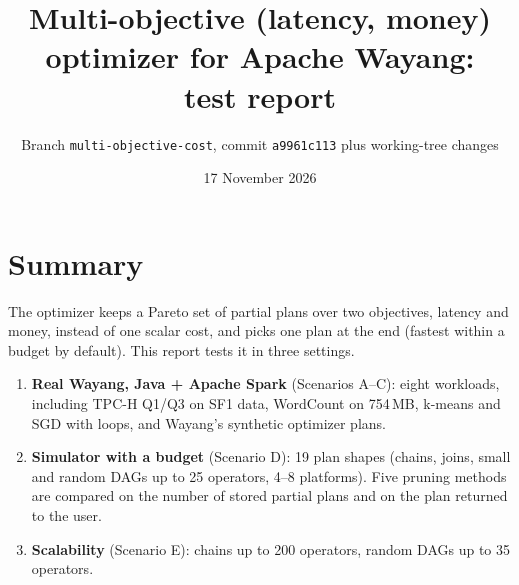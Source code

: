 \documentclass[10pt,a4paper]{article}
\title{Multi-objective (latency, money) optimizer for Apache Wayang:\\ test report}
\date{17 November 2026}
\author{Branch \texttt{multi-objective-cost}, commit \texttt{a9961c113} plus working-tree changes}
\begin{document}
\maketitle
\tableofcontents

\section{Summary}

The optimizer keeps a Pareto set of partial plans over two objectives, latency and money, instead of one scalar
cost, and picks one plan at the end (fastest within a budget by default). This report tests it in three settings.

\begin{enumerate}
\item \textbf{Real Wayang, Java + Apache Spark} (Scenarios A--C): eight workloads, including TPC-H Q1/Q3 on SF1
data, WordCount on 754\,MB, k-means and SGD with loops, and Wayang's synthetic optimizer plans.
\item \textbf{Simulator with a budget} (Scenario D): 19 plan shapes (chains, joins, small and random DAGs up to 25
operators, 4--8 platforms). Five pruning methods are compared on the number of stored partial plans and on the plan
returned to the user.
\item \textbf{Scalability} (Scenario E): chains up to 200 operators, random DAGs up to 35 operators.
\end{enumerate}
\end{document}
